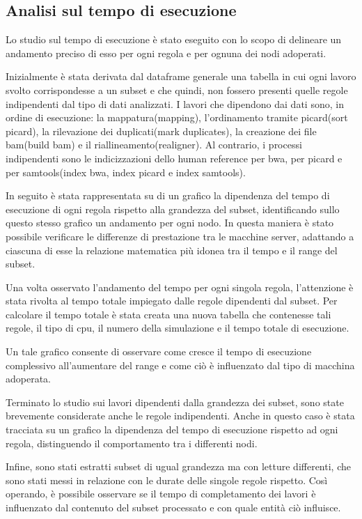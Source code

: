 \subsection{Analisi sul tempo di esecuzione}
\label{sbsec:Te}
Lo studio sul tempo di esecuzione è stato eseguito con lo scopo di delineare un andamento preciso di esso per ogni regola e per ognuna dei nodi adoperati.  

Inizialmente è stata derivata dal dataframe generale una tabella in cui ogni lavoro svolto corrispondesse a un subset e che quindi, non fossero presenti quelle regole indipendenti dal tipo di dati analizzati.
I lavori che dipendono dai dati sono, in ordine di esecuzione: la mappatura(mapping), l'ordinamento tramite picard(sort picard), la rilevazione dei duplicati(mark duplicates), la creazione dei file bam(build bam) e il riallineamento(realigner).
Al contrario, i processi indipendenti sono le indicizzazioni dello human reference per bwa, per picard e per samtools(index bwa, index picard e index samtools). 

In seguito è stata rappresentata su di un grafico la dipendenza del tempo di esecuzione di ogni regola rispetto alla grandezza del subset, identificando sullo questo stesso grafico un andamento per ogni nodo. 
In questa maniera è stato possibile verificare le differenze di prestazione tra le macchine server, adattando a ciascuna di esse la relazione matematica più idonea tra il tempo e il range del subset.

Una volta osservato l'andamento del tempo per ogni singola regola, l'attenzione è stata rivolta al tempo totale impiegato dalle regole dipendenti dal subset.
Per calcolare il tempo totale è stata creata una nuova tabella che contenesse tali regole, il tipo di cpu, il numero della simulazione e il tempo totale di esecuzione.

Un tale grafico consente di osservare come cresce il tempo di esecuzione complessivo all'aumentare del range e come ciò è influenzato dal tipo di macchina adoperata.

Terminato lo studio sui lavori dipendenti dalla grandezza dei subset, sono state brevemente considerate anche le regole indipendenti.
Anche in questo caso è stata tracciata su un grafico la dipendenza del tempo di esecuzione rispetto ad ogni regola, distinguendo il comportamento tra i differenti nodi.  

Infine, sono stati estratti subset di ugual grandezza ma con letture differenti, che sono stati messi in relazione con le durate delle singole regole rispetto.
Così operando, è possibile osservare se il tempo di completamento dei lavori è influenzato dal contenuto del subset processato e con quale entità ciò influisce.

